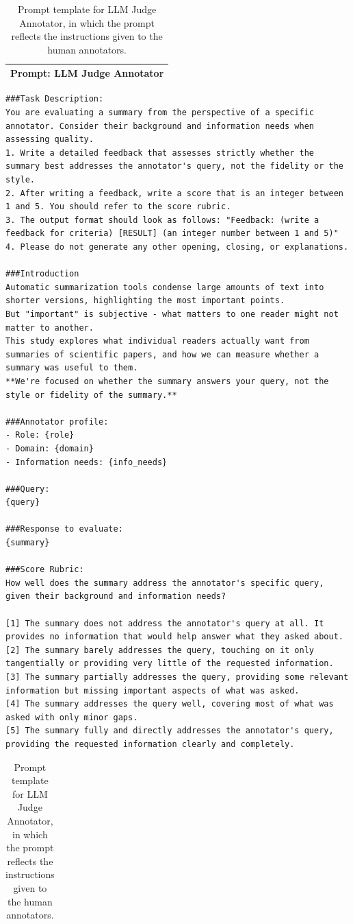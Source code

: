 
\begin{table}[h]
\centering
\footnotesize
\begin{tabular}{p{}}
\toprule
\textbf{Prompt: LLM Judge Annotator} \\
\midrule
\end{tabular}
\begin{lstlisting}[style=promptstyle]
###Task Description:
You are evaluating a summary from the perspective of a specific annotator. Consider their background and information needs when assessing quality.
1. Write a detailed feedback that assesses strictly whether the summary best addresses the annotator's query, not the fidelity or the style.
2. After writing a feedback, write a score that is an integer between 1 and 5. You should refer to the score rubric.
3. The output format should look as follows: "Feedback: (write a feedback for criteria) [RESULT] (an integer number between 1 and 5)"
4. Please do not generate any other opening, closing, or explanations.

###Introduction
Automatic summarization tools condense large amounts of text into shorter versions, highlighting the most important points.
But "important" is subjective - what matters to one reader might not matter to another.
This study explores what individual readers actually want from summaries of scientific papers, and how we can measure whether a summary was useful to them.
**We're focused on whether the summary answers your query, not the style or fidelity of the summary.**

###Annotator profile:
- Role: {role}
- Domain: {domain}
- Information needs: {info_needs}

###Query:
{query}

###Response to evaluate:
{summary}

###Score Rubric:
How well does the summary address the annotator's specific query, given their background and information needs?
        
[1] The summary does not address the annotator's query at all. It provides no information that would help answer what they asked about.
[2] The summary barely addresses the query, touching on it only tangentially or providing very little of the requested information.
[3] The summary partially addresses the query, providing some relevant information but missing important aspects of what was asked.
[4] The summary addresses the query well, covering most of what was asked with only minor gaps.
[5] The summary fully and directly addresses the annotator's query, providing the requested information clearly and completely.
\end{lstlisting}
\begin{tabular}{p{\textwidth}}
\bottomrule
\end{tabular}
\caption{Prompt template for LLM Judge Annotator, in which the prompt reflects the instructions given to the human annotators.}\label{tab:ch-7-prompt-llm-judge-annotator}
\end{table}

